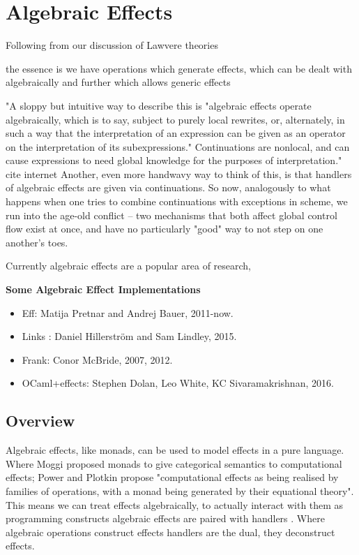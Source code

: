 \section{Algebraic Effects}
Following from our discussion of Lawvere theories

the essence is we have operations which generate effects,
which can be dealt with algebraically %
and further which allows generic effects




"A sloppy but intuitive way to describe this is "algebraic effects operate algebraically, which is to say, subject to purely local rewrites, or, alternately, in such a way that the interpretation of an expression can be given as an operator on the interpretation of its subexpressions." Continuations are nonlocal, and can cause expressions to need global knowledge for the purposes of interpretation."
cite internet
Another, even more handwavy way to think of this, is that handlers of algebraic effects are given via continuations. So now, analogously to what happens when one tries to combine continuations with exceptions in scheme, we run into the age-old conflict -- two mechanisms that both affect global control flow exist at once, and have no particularly "good" way to not step on one another's toes.



Currently algebraic effects are a popular area of research,

\textbf{Some Algebraic Effect Implementations}
\begin{itemize}
    \item Eff: Matija Pretnar and Andrej Bauer, 2011-now.
    \item Links : Daniel Hillerström and Sam Lindley, 2015.
    \item Frank: Conor McBride, 2007, 2012.
    \item OCaml+effects: Stephen Dolan, Leo White, KC Sivaramakrishnan, 2016.
\end{itemize}

\subsection{Overview}
Algebraic effects, like monads, can be used to model effects in a pure language.
Where Moggi \cite{moggi1989computational} proposed monads to give categorical semantics to computational effects;
Power and Plotkin \cite{Plotkin:2002dw} propose "computational effects as being realised by
families of operations, with a monad being generated by their equational theory".
This means we can treat effects algebraically,
to actually interact with them as programming constructs algebraic effects are paired with
handlers \cite{plotkin2009handlers}.
Where algebraic operations construct effects handlers are the dual, they deconstruct effects.

